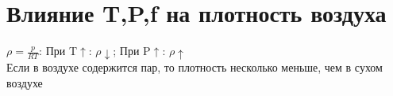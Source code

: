 
\section{Влияние T,P,f на плотность воздуха}
$\rho=\frac{p}{RT}$: При T$\uparrow$: $\rho\downarrow$; При P$\uparrow$: $\rho\uparrow$\\
Если в воздухе содержится пар, то плотность несколько меньше, чем в сухом воздухе

